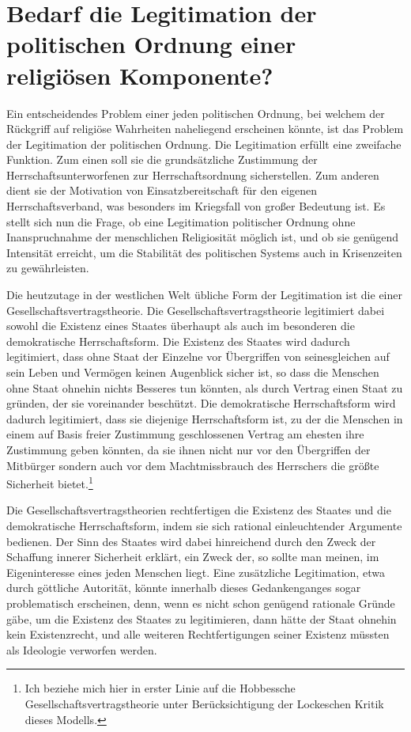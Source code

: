 \section{Bedarf die Legitimation der politischen Ordnung einer religiösen Komponente?} 

Ein entscheidendes Problem einer jeden politischen Ordnung, bei welchem der
Rückgriff auf religiöse Wahrheiten naheliegend erscheinen könnte, ist das
Problem der Legitimation der politischen Ordnung. Die Legitimation erfüllt
eine zweifache Funktion. Zum einen soll sie die grundsätzliche Zustimmung der
Herrschaftsunterworfenen zur Herrschaftsordnung sicherstellen. Zum anderen
dient sie der Motivation von Einsatzbereitschaft für den eigenen
Herrschaftsverband, was besonders im Kriegsfall von großer Bedeutung ist. Es
stellt sich nun die Frage, ob eine Legitimation politischer Ordnung ohne
Inanspruchnahme der menschlichen Religiosität möglich ist, und ob sie genügend
Intensität erreicht, um die Stabilität des politischen Systems auch in
Krisenzeiten zu gewährleisten.

Die heutzutage in der westlichen Welt übliche Form der Legitimation ist die
einer Gesellschaftsvertragstheorie. Die Gesellschaftsvertragstheorie
legitimiert dabei sowohl die Existenz eines Staates überhaupt als auch im
besonderen die demokratische Herrschaftsform. Die Existenz des Staates wird
dadurch legitimiert, dass ohne Staat der Einzelne vor Übergriffen von
seinesgleichen auf sein Leben und Vermögen keinen Augenblick sicher ist, so
dass die Menschen ohne Staat ohnehin nichts Besseres tun könnten, als durch
Vertrag einen Staat zu gründen, der sie voreinander beschützt. Die
demokratische Herrschaftsform wird dadurch legitimiert, dass sie diejenige
Herrschaftsform ist, zu der die Menschen in einem auf Basis freier Zustimmung
geschlossenen Vertrag am ehesten ihre Zustimmung geben könnten, da sie ihnen
nicht nur vor den Übergriffen der Mitbürger sondern auch vor dem
Machtmissbrauch des Herrschers die größte Sicherheit bietet.\footnote{Ich
  beziehe mich hier in erster Linie auf die Hobbessche
  Gesellschaftsvertragstheorie unter Berücksichtigung der Lockeschen Kritik
  dieses Modells.}

Die Gesellschaftsvertragstheorien rechtfertigen die Existenz des Staates und
die demokratische Herrschaftsform, indem sie sich rational einleuchtender
Argumente bedienen. Der Sinn des Staates wird dabei hinreichend durch den
Zweck der Schaffung innerer Sicherheit erklärt, ein Zweck der, so sollte man
meinen, im Eigeninteresse eines jeden Menschen liegt. Eine zusätzliche
Legitimation, etwa durch göttliche Autorität, könnte innerhalb dieses
Gedankenganges sogar problematisch erscheinen, denn, wenn es nicht schon
genügend rationale Gründe gäbe, um die Existenz des Staates zu legitimieren,
dann hätte der Staat ohnehin kein Existenzrecht, und alle weiteren
Rechtfertigungen seiner Existenz müssten als Ideologie verworfen werden.

